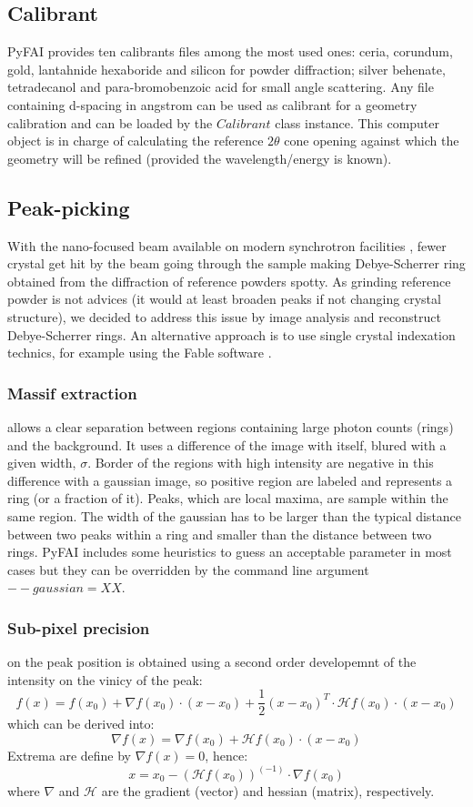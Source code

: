 \documentclass[preprint]{iucr}
\begin{document}
\subsection{Calibrant}
PyFAI provides ten calibrants files among the most used ones: ceria, corundum,
gold, lantahnide hexaboride and silicon for powder diffraction; silver behenate,
tetradecanol and para-bromobenzoic acid for small angle scattering.
Any file containing d-spacing in angstrom can be used as calibrant for a
geometry calibration and can be loaded by the $Calibrant$ class instance.
This computer object is in charge of
calculating the reference $2\theta$ cone opening 
against which the geometry will be refined (provided the wavelength/energy is
known).

\subsection{Peak-picking}
With the nano-focused beam available on modern synchrotron facilities
\cite{id13}, fewer crystal get hit by the beam going through the
sample making Debye-Scherrer ring obtained from the diffraction of reference
powders spotty.
As grinding reference powder is not advices (it would at least broaden peaks if
not changing crystal structure), we decided to address this issue by image analysis 
and reconstruct Debye-Scherrer rings.
An alternative approach is to use single crystal indexation technics, for
example using the Fable software \cite{bonnin}.

\subsubsection{Massif extraction}
allows a clear separation between regions containing large
photon counts (rings) and the background.
It uses a difference of the image with itself, blured with a given width,
$\sigma$. 
Border of the regions with high intensity are negative in this
difference with a gaussian image, so positive region are labeled and represents
a ring (or a fraction of it). Peaks, which are local maxima, are sample within
the same region.
The width of the gaussian has to be larger than the typical distance
between two peaks within a ring and smaller than the distance between two
rings. 
PyFAI includes some heuristics to guess an acceptable parameter in most cases
but they can be overridden by the command line argument $--gaussian=XX$.

\subsubsection{Sub-pixel precision} 
on the peak position is obtained using a second order developemnt of the
intensity on the vinicy of the peak:
$$ f(x) = f(x_0) + \nabla f(x_0)\cdot (x-x_0) + \frac{1}{2}
(x-x_0)^T\cdot\mathcal{H} f(x_0)\cdot(x-x_0)$$ 
which can be derived into:
$$\nabla f(x) =\nabla f(x_0) + \mathcal{H}f(x_0)\cdot(x-x_0)$$
Extrema are define by $\nabla f(x)=0$, hence:
$$x = x_0 - (\mathcal{H} f(x_0))^(-1)\cdot\nabla f(x_0)$$
where $\nabla$ and $\mathcal{H}$ are the gradient (vector) and hessian
(matrix), respectively.
\end{document}
